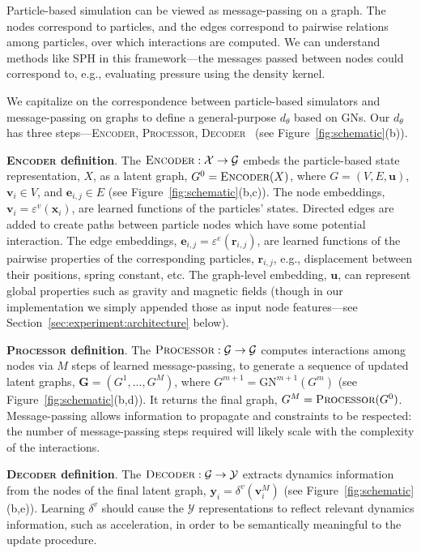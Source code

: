 \documentclass{article}
\newcommand{\xhdr}[1]{{\noindent\bfseries #1}.}
\newcommand{\encoder}{\textsc{Encoder}}
\newcommand{\processor}{\textsc{Processor}}
\newcommand{\decoder}{\textsc{Decoder}}
\begin{document}
Particle-based simulation can be viewed as message-passing on a graph. The nodes correspond to particles, and the edges correspond to pairwise relations among particles, over which interactions are computed. 
We can understand methods like SPH in this framework---the messages passed between nodes could correspond to, e.g., evaluating pressure using the density kernel.

We capitalize on the correspondence between particle-based simulators and message-passing on graphs to define a general-purpose $d_\theta$ based on GNs. Our $d_\theta$ has three steps---\encoder, \processor, \decoder~\cite{battaglia2018relational} (see Figure~\ref{fig:schematic}(b)).

\xhdr{\encoder{} definition} The ${\encoder: \mathcal{X} \rightarrow \mathcal{G}}$ embeds the particle-based state representation, $X$, as a latent graph, ${G^0 = \encoder(X)}$, where $G = (V, E, \mathbf{u})$, $\mathbf{v}_i \in V$, and $\mathbf{e}_{i,j} \in E$ (see Figure~\ref{fig:schematic}(b,c)). 
%
The node embeddings, $\mathbf{v}_i = \varepsilon^v(\mathbf{x}_i)$, are learned functions of the particles' states.
%
Directed edges are added to create paths between particle nodes which have some potential interaction. The edge embeddings, $\mathbf{e}_{i,j} = \varepsilon^e(\mathbf{r}_{i,j})$, are learned functions of the pairwise properties of the corresponding particles, $\mathbf{r}_{i,j}$, e.g., displacement between their positions, spring constant, etc.
%
The graph-level embedding, $\mathbf{u}$, can represent global properties such as gravity and magnetic fields (though in our implementation we simply appended those as input node features---see Section~\ref{sec:experiment:architecture} below).

\xhdr{\processor{} definition} The ${\processor: \mathcal{G} \rightarrow \mathcal{G}}$ computes interactions among nodes via $M$ steps of learned message-passing, to generate a sequence of updated latent graphs, ${\mathbf{G} = (G^1, ..., G^M)}$, where ${G^{m+1} = \mathrm{GN}^{m+1}(G^m)}$ (see Figure~\ref{fig:schematic}(b,d)). It returns the final graph, ${G^M = \processor(G^0)}$. Message-passing allows information to propagate and constraints to be respected: the number of message-passing steps required will likely scale with the complexity of the interactions.

\xhdr{\decoder{} definition} The ${\decoder: \mathcal{G} \rightarrow \mathcal{Y}}$ extracts dynamics information from the nodes of the final latent graph, ${\mathbf{y}_i = \delta^v(\mathbf{v}^M_i)}$ (see Figure~\ref{fig:schematic}(b,e)).
%
Learning $\delta^v$ should cause the $\mathcal{Y}$ representations to reflect relevant dynamics information, such as acceleration, in order to be semantically meaningful to the update procedure.
 
\end{document}
